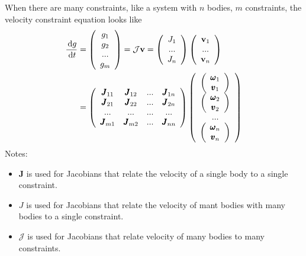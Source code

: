         When there are many constraints, like a system with $n$ bodies, $m$ constraints, the velocity constraint equation looks like
        \begin{equation}
            \begin{aligned}
            \frac{\,\mathrm{d} g}{\,\mathrm{d} t} &= \left( \begin{array}{c} g_1 \\g_2 \\ ...\\g_m\end{array}\right)= \mathcal{J}\mathbf{v} = \left( \begin{array}{c} J_1 \\ ... \\ J_n \end{array} \right) \left( \begin{array}{c} \mathbf{v}_1 \\ ... \\ \mathbf{v}_n \end{array} \right) \\
            &= \left( \begin{array}{cccc} \pmb{J}_{11} & \pmb{J}_{12} & ... & \pmb{J}_{1n} \\ \pmb{J}_{21} & \pmb{J}_{22} & ... & \pmb{J}_{2n} \\ ... & ... & ... & ... \\ \pmb{J}_{m1} & \pmb{J}_{m2} & ... & \pmb{J}_{nn}\end{array} \right) \left(\begin{array}{c}\left(\begin{array}{c}\pmb{\omega}_1 \\ \pmb{v}_1\end{array}\right) \\ \left(\begin{array}{c}\pmb{\omega}_2 \\ \pmb{v}_2\end{array}\right) \\ ... \\ \left(\begin{array}{c}\pmb{\omega}_n \\ \pmb{v}_n\end{array}\right)\end{array}\right)
            \end{aligned} 
        \end{equation}
        Notes:
        \begin{itemize}
            \item $\pmb{J}$ is used for Jacobians that relate the velocity of a single body to a single constraint.
            \item $J$ is used for Jacobians that relate the velocity of mant bodies with many bodies to a single constraint.
            \item $\mathcal{J}$ is used for Jacobians that relate velocity of many bodies to many constraints. 
        \end{itemize}

